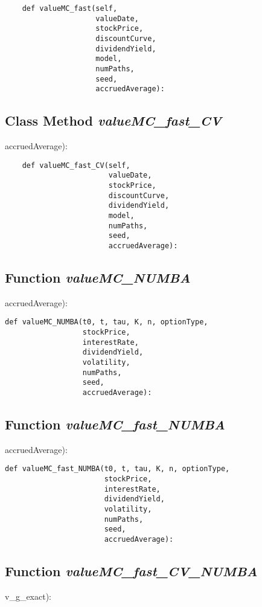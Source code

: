 \documentclass[twoside,11pt]{book}
\begin{document}
\begin{lstlisting}
    def valueMC_fast(self,
                     valueDate,
                     stockPrice,
                     discountCurve,
                     dividendYield,
                     model,
                     numPaths,
                     seed,
                     accruedAverage):
\end{lstlisting}

\subsection{Class Method {\it valueMC\_fast\_CV}}
accruedAverage):

\begin{lstlisting}
    def valueMC_fast_CV(self,
                        valueDate,
                        stockPrice,
                        discountCurve,
                        dividendYield,
                        model,
                        numPaths,
                        seed,
                        accruedAverage):
\end{lstlisting}

\subsection{Function {\it valueMC\_NUMBA}}
accruedAverage):

\begin{lstlisting}
def valueMC_NUMBA(t0, t, tau, K, n, optionType,
                  stockPrice,
                  interestRate,
                  dividendYield,
                  volatility,
                  numPaths,
                  seed,
                  accruedAverage):
\end{lstlisting}

\subsection{Function {\it valueMC\_fast\_NUMBA}}
accruedAverage):

\begin{lstlisting}
def valueMC_fast_NUMBA(t0, t, tau, K, n, optionType,
                       stockPrice,
                       interestRate,
                       dividendYield,
                       volatility,
                       numPaths,
                       seed,
                       accruedAverage):
\end{lstlisting}

\subsection{Function {\it valueMC\_fast\_CV\_NUMBA}}
v\_g\_exact):
\end{document}
